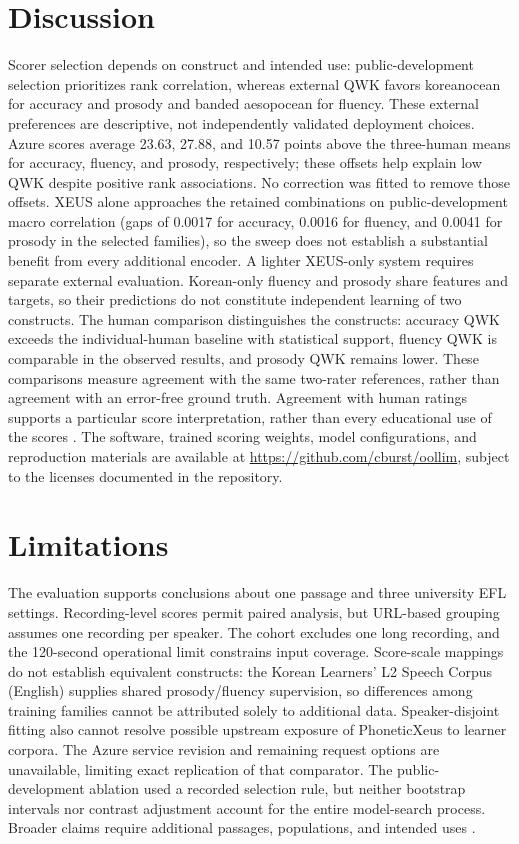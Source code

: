 \documentclass[10pt]{article}
\begin{document}
\section{Discussion}
Scorer selection depends on construct and intended use: public-development selection prioritizes rank correlation, whereas external QWK favors koreanocean for accuracy and prosody and banded aesopocean for fluency. These external preferences are descriptive, not independently validated deployment choices. Azure scores average 23.63, 27.88, and 10.57 points above the three-human means for accuracy, fluency, and prosody, respectively; these offsets help explain low QWK despite positive rank associations. No correction was fitted to remove those offsets. XEUS alone approaches the retained combinations on public-development macro correlation (gaps of 0.0017 for accuracy, 0.0016 for fluency, and 0.0041 for prosody in the selected families), so the sweep does not establish a substantial benefit from every additional encoder. A lighter XEUS-only system requires separate external evaluation. Korean-only fluency and prosody share features and targets, so their predictions do not constitute independent learning of two constructs. The human comparison distinguishes the constructs: accuracy QWK exceeds the individual-human baseline with statistical support, fluency QWK is comparable in the observed results, and prosody QWK remains lower. These comparisons measure agreement with the same two-rater references, rather than agreement with an error-free ground truth. Agreement with human ratings supports a particular score interpretation, rather than every educational use of the scores \cite{kane}. The software, trained scoring weights, model configurations, and reproduction materials are available at \url{https://github.com/cburst/oollim}, subject to the licenses documented in the repository.

\section{Limitations}
The evaluation supports conclusions about one passage and three university EFL settings. Recording-level scores permit paired analysis, but URL-based grouping assumes one recording per speaker. The cohort excludes one long recording, and the 120-second operational limit constrains input coverage. Score-scale mappings do not establish equivalent constructs: the Korean Learners' L2 Speech Corpus (English) supplies shared prosody/fluency supervision, so differences among training families cannot be attributed solely to additional data. Speaker-disjoint fitting also cannot resolve possible upstream exposure of PhoneticXeus to learner corpora. The Azure service revision and remaining request options are unavailable, limiting exact replication of that comparator. The public-development ablation used a recorded selection rule, but neither bootstrap intervals nor contrast adjustment account for the entire model-search process. Broader claims require additional passages, populations, and intended uses \cite{kane}.
\end{document}
